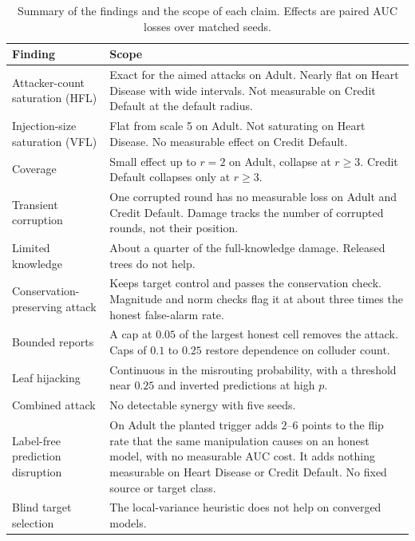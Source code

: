 \documentclass[11pt]{article}
\newcommand{\rev}[1]{{\color{blue}#1}}
\newcommand{\revfloat}[1]{{\color{blue}#1}}
\begin{document}
\begin{table}[htbp]
\centering
\revfloat{\caption{Summary of the findings and the scope of each claim. Effects are paired AUC losses over matched seeds.}\label{tab:summary}}
\begin{tabular}{p{4.0cm}p{9.8cm}}
\toprule
\rev{Finding} & \rev{Scope} \\
\midrule
\rev{Attacker-count saturation (HFL)} & \rev{Exact for the aimed attacks on Adult. Nearly flat on Heart Disease with wide intervals. Not measurable on Credit Default at the default radius.} \\
\rev{Injection-size saturation (VFL)} & \rev{Flat from scale 5 on Adult. Not saturating on Heart Disease. No measurable effect on Credit Default.} \\
\rev{Coverage} & \rev{Small effect up to $r=2$ on Adult, collapse at $r\geq3$. Credit Default collapses only at $r\geq3$.} \\
\rev{Transient corruption} & \rev{One corrupted round has no measurable loss on Adult and Credit Default. Damage tracks the number of corrupted rounds, not their position.} \\
\rev{Limited knowledge} & \rev{About a quarter of the full-knowledge damage. Released trees do not help.} \\
\rev{Conservation-preserving attack} & \rev{Keeps target control and passes the conservation check. Magnitude and norm checks flag it at about three times the honest false-alarm rate.} \\
\rev{Bounded reports} & \rev{A cap at $0.05$ of the largest honest cell removes the attack. Caps of $0.1$ to $0.25$ restore dependence on colluder count.} \\
\rev{Leaf hijacking} & \rev{Continuous in the misrouting probability, with a threshold near $0.25$ and inverted predictions at high $p$.} \\
\rev{Combined attack} & \rev{No detectable synergy with five seeds.} \\
\rev{Label-free prediction disruption} & \rev{On Adult the planted trigger adds $2$--$6$ points to the flip rate that the same manipulation causes on an honest model, with no measurable AUC cost. It adds nothing measurable on Heart Disease or Credit Default. No fixed source or target class.} \\
\rev{Blind target selection} & \rev{The local-variance heuristic does not help on converged models.} \\
\bottomrule
\end{tabular}
\end{table}
\end{document}
